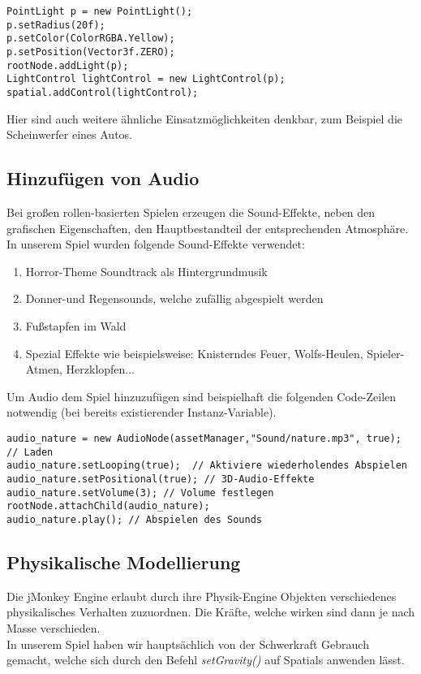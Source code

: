 \begin{lstlisting}
PointLight p = new PointLight();
p.setRadius(20f);
p.setColor(ColorRGBA.Yellow); 
p.setPosition(Vector3f.ZERO);
rootNode.addLight(p);
LightControl lightControl = new LightControl(p);
spatial.addControl(lightControl); 
\end{lstlisting}


 Hier sind auch weitere ähnliche Einsatzmöglichkeiten denkbar, zum Beispiel die Scheinwerfer eines Autos. 


\subsection{Hinzufügen von Audio}
Bei großen rollen-basierten Spielen erzeugen die Sound-Effekte, neben den grafischen Eigenschaften, den Hauptbestandteil der entsprechenden Atmosphäre. In unserem Spiel wurden folgende Sound-Effekte verwendet:
\begin{enumerate}
	\item Horror-Theme Soundtrack als Hintergrundmusik
	\item Donner-und Regensounds, welche zufällig abgespielt werden
	\item Fußstapfen im Wald
	\item Spezial Effekte wie beispielsweise: Knisterndes Feuer, Wolfs-Heulen, Spieler-Atmen, Herzklopfen...
\end{enumerate} Um Audio dem Spiel hinzuzufügen sind beispielhaft die folgenden Code-Zeilen notwendig (bei bereits existierender Instanz-Variable).

\begin{lstlisting}
audio_nature = new AudioNode(assetManager,"Sound/nature.mp3", true); // Laden
audio_nature.setLooping(true);  // Aktiviere wiederholendes Abspielen
audio_nature.setPositional(true); // 3D-Audio-Effekte  
audio_nature.setVolume(3); // Volume festlegen
rootNode.attachChild(audio_nature); 
audio_nature.play(); // Abspielen des Sounds
\end{lstlisting}


\subsection{Physikalische Modellierung}
Die jMonkey Engine erlaubt durch ihre Physik-Engine Objekten verschiedenes physikalisches Verhalten zuzuordnen. Die Kräfte, welche wirken sind dann je nach Masse verschieden.\\
In unserem Spiel haben wir hauptsächlich von der Schwerkraft Gebrauch gemacht, welche sich durch den Befehl\emph{ setGravity()} auf Spatials anwenden lässt.

